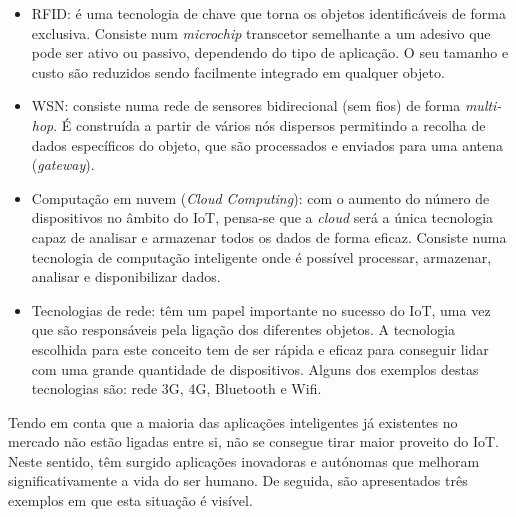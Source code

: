 \begin{itemize}
	\item \ac{RFID}: é uma tecnologia de chave que torna os objetos identificáveis de forma exclusiva. Consiste num \textit{microchip} transcetor semelhante a um adesivo que pode ser ativo ou passivo, dependendo do tipo de aplicação. O seu tamanho e custo são reduzidos sendo facilmente integrado em qualquer objeto. 
	  
	\item \ac{WSN}: consiste numa rede de sensores bidirecional (sem fios) de forma\textit{ multi-hop}. É construída a partir de vários nós dispersos permitindo a recolha de dados específicos do objeto, que são processados e enviados para uma antena (\textit{gateway}). 
	
	\item Computação em nuvem (\textit{Cloud Computing}): com o aumento do número de dispositivos no âmbito do IoT, pensa-se que a \textit{cloud} será a única tecnologia capaz de analisar e armazenar todos os dados de forma eficaz. Consiste numa tecnologia de computação inteligente onde é possível processar, armazenar, analisar e disponibilizar dados.   
	
	\item Tecnologias de rede: têm um papel importante no sucesso do IoT, uma vez que são responsáveis pela ligação dos diferentes objetos. A tecnologia escolhida para este conceito tem de ser rápida e eficaz para conseguir lidar com uma grande quantidade de dispositivos. Alguns dos exemplos destas tecnologias são: rede 3G, 4G, Bluetooth e Wifi. 
	
\end{itemize}



Tendo em conta que a maioria das aplicações inteligentes já existentes no mercado não estão ligadas entre si, não se consegue tirar maior proveito do IoT. Neste sentido, têm surgido aplicações inovadoras e autónomas que melhoram significativamente a vida do ser humano\cite{Farooq2015}. De seguida, são apresentados três exemplos em que esta situação é visível. 


